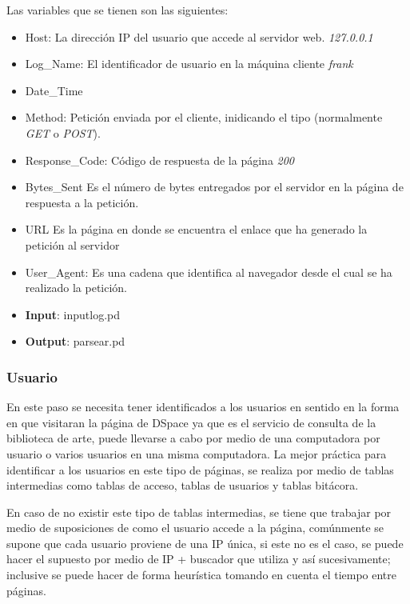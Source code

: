 Las variables que se tienen son las siguientes:

\begin{itemize}
\itemsep1pt\parskip0pt
\item
  Host: La dirección IP del usuario que accede al servidor web. \emph{127.0.0.1}
\item
  Log\_Name: El identificador de usuario en la máquina cliente \emph{frank}
\item
  Date\_Time
\item
  Method: Petición enviada por el cliente, inidicando el tipo (normalmente \emph{GET} o \emph{POST}).
\item
  Response\_Code: Código de respuesta de la página \emph{200}
\item
  Bytes\_Sent Es el número de bytes entregados por el servidor en la página de respuesta a la petición.
\item
  URL Es la página en donde se encuentra el enlace que ha generado la petición al servidor
\item
  User\_Agent: Es una cadena que identifica al navegador desde el cual se ha realizado la petición. 
\end{itemize}


\begin{itemize}
\item \textbf{Input}: inputlog.pd
\item \textbf{Output}: parsear.pd
\end{itemize}


\subsubsection{ Usuario}\label{iii-usuario}

En este paso se necesita tener identificados a los usuarios en sentido en la forma en que visitaran la página de DSpace ya que es el servicio de consulta de la biblioteca de arte, puede llevarse a cabo por medio de una computadora por usuario o varios usuarios en una misma computadora. La mejor práctica para identificar a los usuarios en este tipo de páginas, se realiza por medio de tablas intermedias como tablas de acceso, tablas de usuarios y tablas bitácora\citep{andersen2000analyzing}.

En caso de no existir este tipo de tablas intermedias, se tiene que trabajar por medio de suposiciones de como el usuario accede a la página, comúnmente se supone que cada usuario proviene de una IP única, si este no es el caso, se puede hacer el supuesto por medio de IP + buscador que utiliza y así sucesivamente; inclusive se puede hacer de forma heurística tomando en cuenta el tiempo entre páginas.

